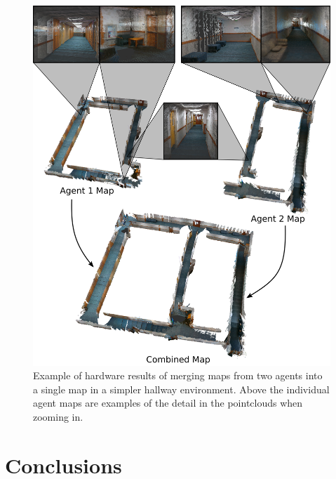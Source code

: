 \documentclass[letterpaper, 10 pt, conference]{ieeeconf}  %
\begin{document}
\begin{figure}
\centering
\includegraphics[width=0.9\linewidth]{wilk3_map.png}
\caption{Example of hardware results of merging maps from two agents into a single map in a simpler hallway environment. Above the individual agent maps are examples of the detail in the pointclouds when zooming in.}
\label{fig:wilk3_map}
\end{figure}
\section{Conclusions}\label{conclusions}




\end{document}
